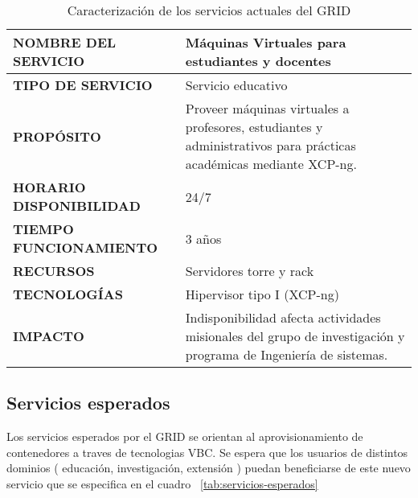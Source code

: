 \begin{table}[H]
	\centering
	\renewcommand{\arraystretch}{1.2}
	\setlength{\tabcolsep}{3pt}
	\tiny
	\begin{tabularx}{\textwidth}{|>{\raggedright\arraybackslash}p{}|X|}
		\hline
		\textbf{NOMBRE DEL SERVICIO}    & Máquinas Virtuales para estudiantes y docentes                                                                    \\
		\hline
		\textbf{TIPO DE SERVICIO}       & Servicio educativo                                                                                                \\
		\hline
		\textbf{PROPÓSITO}              & Proveer máquinas virtuales a profesores, estudiantes y administrativos para prácticas académicas mediante XCP-ng. \\
		\hline
		\textbf{HORARIO DISPONIBILIDAD} & 24/7                                                                                                              \\
		\hline
		\textbf{TIEMPO FUNCIONAMIENTO}  & 3 años                                                                                                            \\
		\hline
		\textbf{RECURSOS}               & Servidores torre y rack                                                                                           \\
		\hline
		\textbf{TECNOLOGÍAS}            & Hipervisor tipo I (XCP-ng)                                                                                        \\
		\hline
		\textbf{IMPACTO}                & Indisponibilidad afecta actividades misionales del grupo de investigación y programa de Ingeniería de sistemas.   \\
		\hline
	\end{tabularx}
	\caption{Caracterización de los servicios actuales del GRID}\label{tab:servicios-actuales}
\end{table}

\subsection{Servicios esperados}
Los servicios esperados por el GRID se orientan al aprovisionamiento de contenedores a traves de tecnologias VBC. Se espera que los usuarios de distintos dominios ( educación, investigación, extensión ) puedan beneficiarse de este nuevo servicio que se especifica en el cuadro ~\ref{tab:servicios-esperados}


